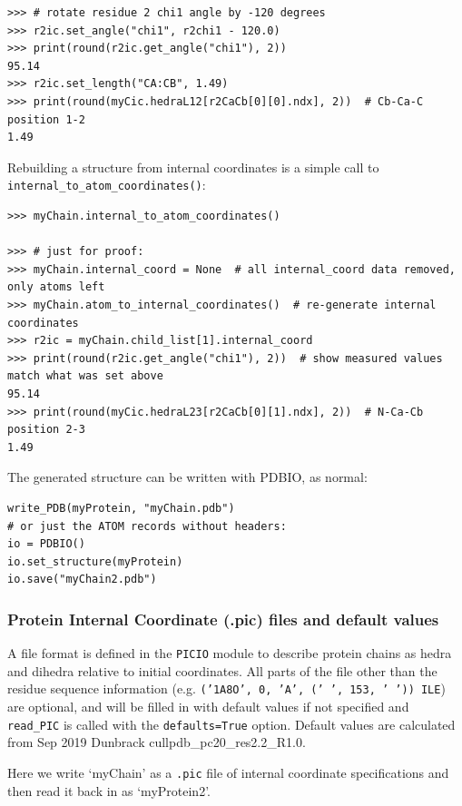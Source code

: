 \begin{verbatim}
>>> # rotate residue 2 chi1 angle by -120 degrees
>>> r2ic.set_angle("chi1", r2chi1 - 120.0)
>>> print(round(r2ic.get_angle("chi1"), 2))
95.14
>>> r2ic.set_length("CA:CB", 1.49)
>>> print(round(myCic.hedraL12[r2CaCb[0][0].ndx], 2))  # Cb-Ca-C position 1-2
1.49
\end{verbatim}

Rebuilding a structure from internal coordinates is a simple call to
\verb|internal_to_atom_coordinates()|:

\begin{verbatim}
>>> myChain.internal_to_atom_coordinates()

>>> # just for proof:
>>> myChain.internal_coord = None  # all internal_coord data removed, only atoms left
>>> myChain.atom_to_internal_coordinates()  # re-generate internal coordinates
>>> r2ic = myChain.child_list[1].internal_coord
>>> print(round(r2ic.get_angle("chi1"), 2))  # show measured values match what was set above
95.14
>>> print(round(myCic.hedraL23[r2CaCb[0][1].ndx], 2))  # N-Ca-Cb position 2-3
1.49
\end{verbatim}

The generated structure can be written with PDBIO, as normal:

\begin{verbatim}
write_PDB(myProtein, "myChain.pdb")
# or just the ATOM records without headers:
io = PDBIO()
io.set_structure(myProtein)
io.save("myChain2.pdb")
\end{verbatim}

\subsubsection{Protein Internal Coordinate (.pic) files and default values}

A file format is defined in the \texttt{PICIO} module to describe protein chains as hedra and
dihedra relative to initial coordinates.  All parts of the file other than the residue sequence
information (e.g. \texttt{('1A8O', 0, 'A', (' ', 153, ' ')) ILE}) are optional, and will be
filled in with default values if not specified and \texttt{read\_PIC\(\)} is called with the
\texttt{defaults=True} option.  Default values are calculated from Sep 2019 Dunbrack
cullpdb\_pc20\_res2.2\_R1.0.

Here we write `myChain' as a \texttt{.pic} file of internal coordinate specifications and then
read it back in as `myProtein2'.

